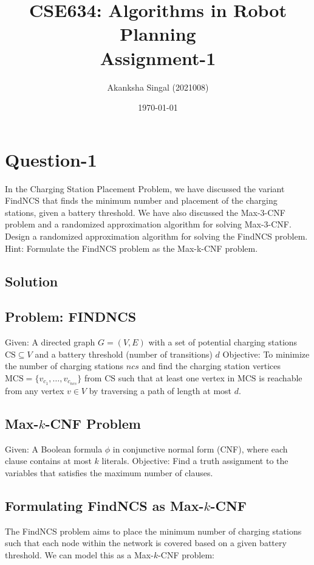 \documentclass[11pt]{article}
\title{
    \textbf{CSE634: Algorithms in Robot Planning} \\ \vspace*{-5pt}
    \textbf{\large{Assignment-1}}
}
\author{Akanksha Singal (2021008)}
\date{\today}
\begin{document}
\maketitle

\section*{Question-1}
In the Charging Station Placement Problem, we have discussed the variant FindNCS that finds the minimum number and placement of the charging stations, given a battery threshold. We have also discussed the Max-3-CNF problem and a randomized approximation algorithm for solving Max-3-CNF. Design a randomized approximation algorithm for solving the FindNCS problem. Hint: Formulate the FindNCS problem as the Max-k-CNF problem.

\subsection*{Solution}

\subsection*{Problem: FINDNCS}

Given: A directed graph \( G = (V, E) \) with a set of potential charging stations \( \text{CS} \subseteq V \) and a battery threshold (number of transitions) \( d \)
\newline
Objective: To minimize the number of charging stations \( ncs \) and find the charging station vertices \( \text{MCS} = \{v_{c_1}, \ldots, v_{c_{ncs}}\} \) from \( \text{CS} \) such that at least one vertex in \( \text{MCS} \) is reachable from any vertex \( v \in V \) by traversing a path of length at most \( d \).


\subsection*{Max-$k$-CNF Problem}

Given: A Boolean formula $\phi$ in conjunctive normal form (CNF), where each clause contains at most $k$ literals.
\newline
Objective: Find a truth assignment to the variables that satisfies the maximum number of clauses. 
    
\subsection*{Formulating FindNCS as Max-$k$-CNF}
The FindNCS problem aims to place the minimum number of charging stations such that each node within the network is covered based on a given battery threshold. We can model this as a Max-$k$-CNF problem:
\end{document}
